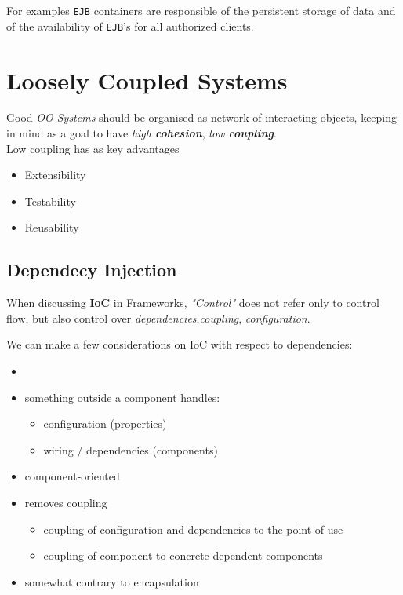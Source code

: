 For examples \texttt{EJB} containers are responsible of the
persistent storage of data and of the availability of
\texttt{EJB}’s for all authorized clients.

\section{Loosely Coupled Systems}
Good \textit{OO Systems} should be organised as
network of interacting objects,
keeping in mind as a goal to have \textit{high \textbf{cohesion}}, \textit{low \textbf{coupling}}.\\
Low coupling has as key advantages
\begin{itemize}
   \item Extensibility
   \item Testability
   \item Reusability
\end{itemize}

\subsection{Dependecy Injection}
When discussing \textbf{IoC} in Frameworks, \textit{"Control"} does not refer only to control flow, but also control over \textit{dependencies},\textit{coupling}, \textit{configuration}.

We can make a few considerations on IoC with respect to dependencies:
\begin{itemize}
   \item 
   \item something outside a component handles:
   \begin{itemize}
      \item configuration (properties)
      \item wiring / dependencies (components)
   \end{itemize}
   \item component-oriented
   \item removes coupling
   \begin{itemize}
      \item coupling of configuration and dependencies to the point of use
      \item coupling of component to concrete dependent components
   \end{itemize}
   \item somewhat contrary to encapsulation
\end{itemize}

